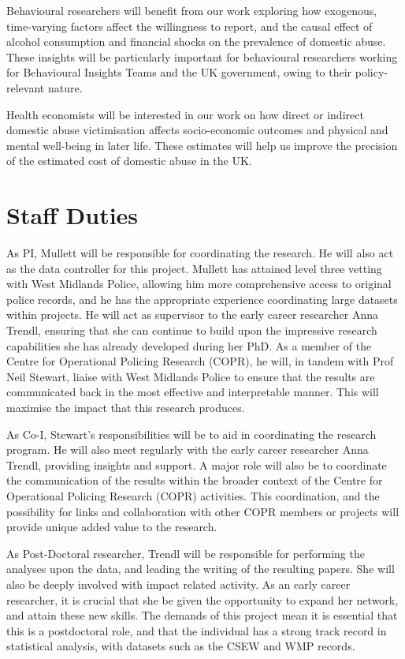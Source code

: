 \documentclass[11pt, a4paper]{article}
\begin{document}
Behavioural researchers will benefit from our work exploring how exogenous, time-varying factors affect the willingness to report, and the causal effect of alcohol consumption and financial shocks on the prevalence of domestic abuse. These insights will be particularly important for behavioural researchers working for Behavioural Insights Teams and the UK government, owing to their policy-relevant nature.


Health economists will be interested in our work on how direct or indirect domestic abuse victimisation affects socio-economic outcomes and physical and mental well-being in later life. These estimates will help us improve the precision of the estimated cost of domestic abuse in the UK.


\section{Staff Duties}

As PI, Mullett will be responsible for coordinating the research. He will also act as the data controller for this project. Mullett has attained level three vetting with West Midlands Police, allowing him more comprehensive access to original police records, and he has the appropriate experience coordinating large datasets within projects. He will act as supervisor to the early career researcher Anna Trendl, ensuring that she can continue to build upon the impressive research capabilities she has already developed during her PhD. As a member of the Centre for Operational Policing Research (COPR), he will, in tandem with Prof Neil Stewart, liaise with West Midlands Police to ensure that the results are communicated back in the most effective and interpretable manner. This will maximise the impact that this research produces.

As Co-I, Stewart's responsibilities will be to aid in coordinating the research program. He will also meet regularly with the early career researcher Anna Trendl, providing insights and support. A major role will also be to coordinate the communication of the results within the broader context of the Centre for Operational Policing Research (COPR) activities. This coordination, and the possibility for links and collaboration with other COPR members or projects will provide unique added value to the research. 

As Post-Doctoral researcher, Trendl will be responsible for performing the analyses upon the data, and leading the writing of the resulting papers. She will also be deeply involved with impact related activity. As an early career researcher, it is crucial that she be given the opportunity to expand her network, and attain these new skills. The demands of this project mean it is essential that this is a postdoctoral role, and that the individual has a strong track record in statistical analysis, with datasets such as the CSEW and WMP records. 
\end{document}
